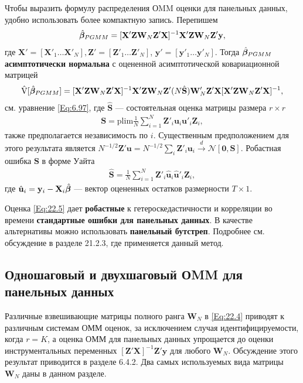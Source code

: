 Чтобы выразить формулу распределения ОMM оценки для панельных данных, удобно использовать более компактную запись. Перепишем
\begin{align}
\hat{\bm{\beta}}_{PGMM}=[\mathbf X' \mathbf Z \mathbf W_N \mathbf Z' \mathbf X]^{-1} \mathbf X' \mathbf Z \mathbf W_N \mathbf Z' \mathbf y,
\label{Eq:22.4}
\end{align}
где  $\mathbf X'=[\mathbf X'_1 \dots \mathbf X'_N], \mathbf Z'=[\mathbf Z'_1 \dots \mathbf Z'_N]$, $\mathbf y'=[\mathbf y'_1 \dots \mathbf y'_N]$. Тогда $\hat{\bm{\beta}}_{PGMM}$ \textbf{асимптотически нормальна}  с оцененной асимптотической ковариационной матрицей
\begin{align}
\hat{\mathrm{V}} [\hat{\bm{\beta}}_{PGMM}]=[\mathbf X' \mathbf Z \mathbf W_N \mathbf Z' \mathbf X]^{-1} \mathbf X' \mathbf Z \mathbf W_N \mathbf Z' 
(N \hat{\mathbf S}) \mathbf W'_N \mathbf Z' \mathbf X
[\mathbf X' \mathbf Z \mathbf W_N \mathbf Z' \mathbf X]^{-1},
\label{Eq:22.5}
\end{align}
см. уравнение \ref{Eq:6.97}, где $\hat{\mathbf S}$ --- состоятельная оценка матрицы размера $r \times r$ 
\begin{align}
\mathbf S =\mathrm{plim} \frac{1}{N} \sum^N_{i=1} \mathbf Z'_i \mathbf u_i \mathbf u'_i \mathbf Z_i,
\label{Eq:22.6}
\end{align}
 также предполагается независимость по $i$. Существенным предположением для этого результата является $N^{-1/2} \mathbf Z' \mathbf u = N^{-1/2} \sum_i \mathbf Z'_i \mathbf u_i \overset{d}\rightarrow \mathcal N[\mathbf 0, \mathbf S]$. Робастная ошибка $\mathbf S$ в форме Уайта  
\begin{align}
\hat{\mathbf S} = \frac{1}{N} \sum^N_{i=1} \mathbf Z'_i \hat{\mathbf u}_i \hat{\mathbf u}'_i \mathbf Z_i,
\label{Eq:22.7}
\end{align}
где  $\hat{\mathbf u}_i=\mathbf y_i- \mathbf X_i \hat{\bm{\beta}}$ --- вектор оцененных остатков размерности $T \times 1$. 

Оценка \ref{Eq:22.5} дает \textbf{робастные} к гетероскедастичности и корреляции во времени \textbf{стандартные ошибки для панельных данных}. В качестве альтернативы можно использовать \textbf{панельный бутстреп}. Подробнее см. обсуждение в разделе 21.2.3, где  применяется данный метод.

\subsection{Одношаговый и двухшаговый ОMM для панельных данных}

Различные взвешивающие матрицы полного ранга $\mathbf W_N$ в \ref{Eq:22.4} приводят к различным системам ОММ оценок, за исключением случая идентифицируемости, когда $r=K$, а оценка ОММ для панельных данных упрощается до оценки инструментальных переменных $[\mathbf Z' \mathbf X]^{-1}\mathbf Z'\mathbf y$ для любого $\mathbf W_N$. Обсуждение этого результат приводится в разделе 6.4.2. Два самых используемых вида матрицы $\mathbf W_N$ даны в данном разделе.

